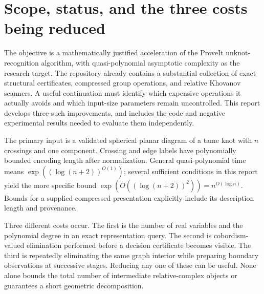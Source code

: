 \section{Scope, status, and the three costs being reduced}
\label{sec:overview}

The objective is a mathematically justified acceleration of the ProveIt
unknot-recognition algorithm, with quasi-polynomial asymptotic
complexity as the research target. The repository already contains a
substantial collection of exact structural certificates, compressed group
operations, and relative Khovanov scanners. A useful continuation must
identify which expensive operations it actually avoids and which input-size
parameters remain uncontrolled. This report develops three such improvements,
and includes the code and negative experimental results needed to evaluate
them independently.

\begin{definition}
The primary input is a validated spherical planar diagram of a tame knot
with $n$ crossings and one component. Crossing and edge labels have
polynomially bounded encoding length after normalization. General
quasi-polynomial time means $\exp((\log(n+2))^{O(1)})$; several sufficient
conditions in this report yield the more specific bound
$\exp(O((\log(n+2))^2))=n^{O(\log n)}$. Bounds for a supplied compressed
presentation explicitly include its description length and provenance.
\end{definition}

Three different costs occur. The first is the number of real variables and
the polynomial degree in an exact representation query. The second is
cobordism-valued elimination performed before a decision certificate becomes
visible. The third is repeatedly eliminating the same graph interior while
preparing boundary observations at successive stages. Reducing any one of
these can be useful. None alone bounds the total number of intermediate
relative-complex objects or guarantees a short geometric decomposition.

